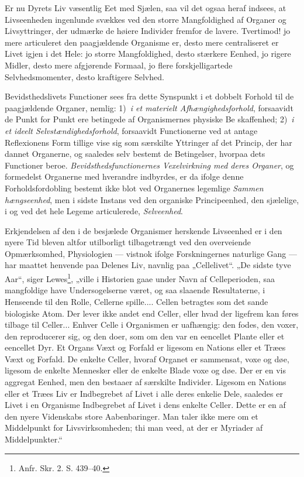 \documentclass[11pt]{book}
\newcommand{\opage}[1]{\marginnote{\footnotesize\textit{[#1]}}}
\begin{document}
Er nu Dyrets Liv væsentlig Eet med Sjælen, saa vil det ogsaa heraf
indsees, at Livseenheden ingenlunde svækkes ved den storre
Mangfoldighed af Organer og Livsyttringer, der udmærke de høiere Individer
fremfor de lavere. Tvertimod! jo mere articuleret den paagjældende
Organisme er, desto mere centraliseret er Livet igjen i det Hele: jo
storre Mangfoldighed, desto stærkere Eenhed, jo rigere Midler, desto
mere afgjørende Formaal, jo flere forskjelligartede Selvhedsmomenter,
desto kraftigere Selvhed.

Bevidsthedslivets Functioner sees fra dette Synspunkt i et dobbelt
Forhold til de paagjældende Organer, nemlig: 1)~\emph{i et materielt
Afhængighedsforhold}, forsaavidt de Punkt for Punkt ere betingede af
Organismernes physiske Be\-%
\opage{343} \setcounter{footnote}{0}%
skaffenhed; 2)~\emph{i et ideelt Selvstændighedsforhold}, forsaavidt
Functionerne ved at antage Reflexionens Form tillige vise sig som
særskilte Yttringer af det Princip, der har dannet Organerne, og saaledes
selv bestemt de Betingelser, hvorpaa dets Functioner beroe.
\emph{Bevidsthedsfunctionernes Vexelvirkning med deres Organer}, og
formedelst Organerne med hverandre indbyrdes, er da ifolge denne
Forholdsfordobling bestemt ikke blot ved Organernes legemlige
\emph{Sammen\-%
hængseenhed}, men i sidste Instans ved den organiske Principeenhed, den
sjælelige, i og ved det hele Legeme articulerede, \emph{Selveenhed}.

Erkjendelsen af den i de besjælede Organismer herskende Livseenhed
er i den nyere Tid bleven altfor utilborligt tilbagetrængt ved den
overveiende Opmærksomhed, Physiologien --- vistnok ifolge Forskningernes
naturlige Gang --- har maattet henvende paa Delenes Liv, navnlig paa
„Cellelivet“. „De sidste tyve Aar“, siger Lewes\footnote{Anfr. Skr. 2. S. 439--40.},
„ville i Historien gaae under Navn af Celleperioden, saa mangfoldige
have Undersogelserne været, og saa slaaende Resultaterne, i Henseende
til den Rolle, Cellerne spille.... Cellen betragtes som det sande
biologiske Atom. Der lever ikke andet end Celler, eller hvad der ligefrem
kan føres tilbage til Celler... Enhver Celle i Organismen er uafhængig:
den fodes, den voxer, den reproducerer sig, og den doer, som om den
var en eencellet Plante eller et eencellet Dyr. Et Organs Væxt og
Forfald er ligesom en Nations eller et Træes Væxt og Forfald. De
enkelte Celler, hvoraf Organet er sammensat, voxe og døe, ligesom de
enkelte Mennesker eller de enkelte Blade voxe og døe. Der er en vis
aggregat Eenhed, men den bestaaer af særskilte Individer. Ligesom en
Nations eller et Træes Liv er Indbegrebet af Livet i alle deres enkelie
Dele, saaledes er Livet i en Organisme Indbegrebet af Livet i dens
enkelte Celler. Dette er en af den nyere Videnskabs store Aabenbaringer.
Man taler ikke mere
\opage{344} \setcounter{footnote}{0}%
om et Middelpunkt for Livsvirksomheden; thi man veed, at der er
Myriader af Middelpunkter.“
\end{document}
